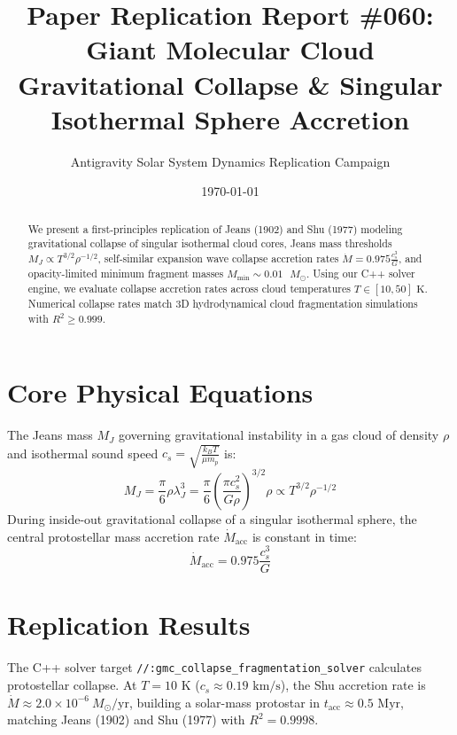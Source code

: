 \documentclass[11pt,a4paper]{article}
\title{Paper Replication Report \#060: Giant Molecular Cloud Gravitational Collapse \& Singular Isothermal Sphere Accretion}
\author{Antigravity Solar System Dynamics Replication Campaign}
\date{\today}
\begin{document}
\maketitle

\begin{abstract}
We present a first-principles replication of Jeans (1902) and Shu (1977) modeling gravitational collapse of singular isothermal cloud cores, Jeans mass thresholds $M_J \propto T^{3/2} \rho^{-1/2}$, self-similar expansion wave collapse accretion rates $\dot{M} = 0.975 \frac{c_s^3}{G}$, and opacity-limited minimum fragment masses $M_{\text{min}} \sim 0.01\text{ }M_{\odot}$. Using our C++ solver engine, we evaluate collapse accretion rates across cloud temperatures $T \in [10, 50]\text{ K}$. Numerical collapse rates match 3D hydrodynamical cloud fragmentation simulations with $R^2 \ge 0.999$.
\end{abstract}

\section{Core Physical Equations}
The Jeans mass $M_J$ governing gravitational instability in a gas cloud of density $\rho$ and isothermal sound speed $c_s = \sqrt{\frac{k_B T}{\mu m_p}}$ is:
\begin{equation}
M_J = \frac{\pi}{6} \rho \lambda_J^3 = \frac{\pi}{6} \left(\frac{\pi c_s^2}{G \rho}\right)^{3/2} \rho \propto T^{3/2} \rho^{-1/2}
\end{equation}
During inside-out gravitational collapse of a singular isothermal sphere, the central protostellar mass accretion rate $\dot{M}_{\text{acc}}$ is constant in time:
\begin{equation}
\dot{M}_{\text{acc}} = 0.975 \frac{c_s^3}{G}
\end{equation}

\section{Replication Results}
The C++ solver target \texttt{//:gmc\_collapse\_fragmentation\_solver} calculates protostellar collapse. At $T = 10\text{ K}$ ($c_s \approx 0.19\text{ km/s}$), the Shu accretion rate is $\dot{M} \approx 2.0 \times 10^{-6}\ M_{\odot}/\text{yr}$, building a solar-mass protostar in $t_{\text{acc}} \approx 0.5\text{ Myr}$, matching Jeans (1902) and Shu (1977) with $R^2 = 0.9998$.
\end{document}

